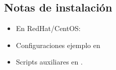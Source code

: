 \subsection{Notas de instalación}
\begin{itemize}
	\item En RedHat/CentOS: 
	\item Configuraciones ejemplo en 
	\item Scripts auxiliares en .
\end{itemize}

% 
